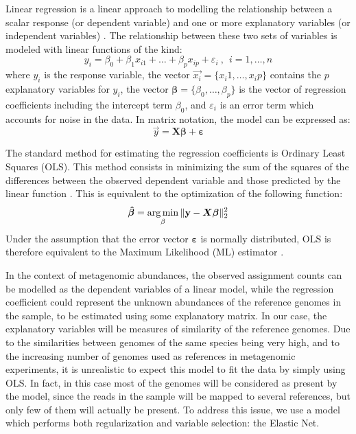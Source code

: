 Linear regression is a linear approach to modelling the relationship between a scalar response (or dependent variable) and one or more explanatory variables (or independent variables) \cite{noauthor_linear_2018}. The relationship between these two sets of variables is modeled with linear functions of the kind:
\begin{equation*}
    y_i = \beta_0 + \beta_1 x_{i1} + \dots + \beta_p x_{ip} + \varepsilon_i ~,~~ i = 1, \dots , n
\end{equation*}
where $y_i$ is the response variable, the vector $\vec{x_i} = \{x_i1, \dots, x_ip \}$ contains the $p$ explanatory variables for $y_i$, the vector $\boldsymbol{\beta} = \{\beta_0, \dots, \beta_p \}$ is the vector of regression coefficients including the intercept term $\beta_0$, and $\varepsilon_i$ is an error term which accounts for noise in the data. In matrix notation, the model can be expressed as:
\begin{equation*}
    \vec{y} = \boldsymbol{X}\boldsymbol{\beta} + \boldsymbol{\varepsilon}
\end{equation*}

The standard method for estimating the regression coefficients is Ordinary Least Squares (OLS). This method consists in minimizing the sum of the squares of the differences between the observed dependent variable and those predicted by the linear function \cite{noauthor_linear_2018}. This is equivalent to the optimization of the following function:
\begin{equation*}
    \boldsymbol{\hat{\beta}} = \operatorname*{arg\,min}_{\beta}{\lVert\mathbf{y} - \boldsymbol{X}\boldsymbol{\beta}\rVert_2^2}
\end{equation*}
Under the assumption that the error vector $\boldsymbol{\varepsilon}$ is normally distributed, OLS is therefore equivalent to the Maximum Likelihood (ML) estimator \cite{noauthor_linear_2018}.

In the context of metagenomic abundances, the observed assignment counts can be modelled as the dependent variables of a linear model, while the regression coefficient could represent the unknown abundances of the reference genomes in the sample, to be estimated using some explanatory matrix. In our case, the explanatory variables will be measures of similarity of the reference genomes. Due to the similarities between genomes of the same species being very high, and to the increasing number of genomes used as references in metagenomic experiments, it is unrealistic to expect this model to fit the data by simply using OLS. In fact, in this case most of the genomes will be considered as present by the model, since the reads in the sample will be mapped to several references, but only few of them will actually be present. To address this issue, we use a model which performs both regularization and variable selection: the Elastic Net.

